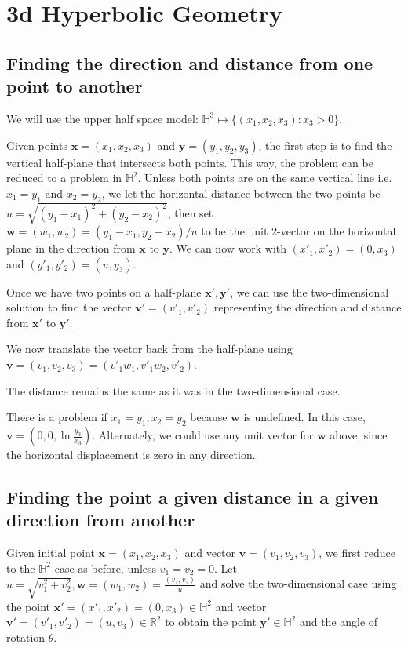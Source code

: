 \section{3d Hyperbolic Geometry}

\subsection{Finding the direction and distance from one point to another}

We will use the upper half space model: $\mathbb{H}^3 \mapsto \{(x_1,x_2,x_3):x_3 > 0\}$.

Given points $\textbf{x} = (x_1,x_2,x_3)$ and $\textbf{y} = (y_1,y_2,y_3)$, the first step is to find the vertical half-plane that intersects both points. This way, the problem can be reduced to a problem in $\mathbb{H}^2$. Unless both points are on the same vertical line i.e. $x_1 = y_1$ and $x_2 = y_2$, we let the horizontal distance between the two points be $u = \sqrt{(y_1-x_1)^2 + (y_2-x_2)^2}$, then set $\textbf{w} = (w_1,w_2) = (y_1-x_1,y_2-x_2)/u$ to be the unit $2$-vector on the horizontal plane in the direction from $\textbf{x}$ to $\textbf{y}$. We can now work with $(x'_1,x'_2) = (0,x_3)$ and $(y'_1,y'_2) = (u,y_3)$.

Once we have two points on a half-plane $\textbf{x}', \textbf{y}'$, we can use the two-dimensional solution to find the vector $\textbf{v}' = (v'_1,v'_2)$ representing the direction and distance from $\textbf{x}'$ to $\textbf{y}'$.

We now translate the vector back from the half-plane using $\textbf{v} = (v_1,v_2,v_3) = (v'_1w_1,v'_1w_2,v'_2)$.

The distance remains the same as it was in the two-dimensional case.

There is a problem if $x_1 = y_1, x_2 = y_2$ because $\textbf{w}$ is undefined. In this case, $\textbf{v} = (0,0,\ln\frac{y_3}{x_3})$. Alternately, we could use any unit vector for $\textbf{w}$ above, since the horizontal displacement is zero in any direction.

\subsection{Finding the point a given distance in a given direction from another}

Given initial point $\textbf{x} = (x_1,x_2,x_3)$ and vector $\textbf{v} = (v_1,v_2,v_3)$, we first reduce to the $\mathbb{H}^2$ case as before, unless $v_1 = v_2 = 0$. Let $u = \sqrt{v_1^2+v_2^2}, \textbf{w} = (w_1,w_2) = \frac{(v_1,v_2)}{u}$ and solve the two-dimensional case using the point $\textbf{x}' = (x'_1,x'_2) = (0,x_3) \in \mathbb{H}^2$ and vector $\textbf{v}' = (v'_1,v'_2) = (u,v_3) \in \mathbb{R}^2$ to obtain the point $\textbf{y}' \in \mathbb{H}^2$ and the angle of rotation $\theta$.

